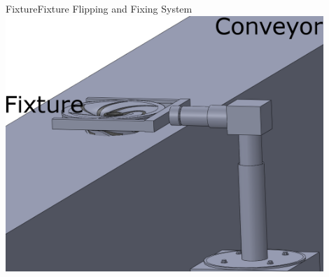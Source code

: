\begin{frame}{Fixture}{Fixture Flipping and Fixing System}
 \centering
    \includegraphics[width=0.9\textwidth]{graphics/andrej/fixture_flipping_mechanism}

\end{frame}













